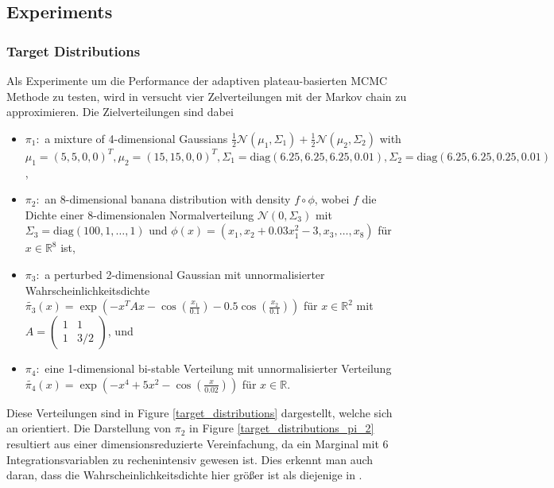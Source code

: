 \documentclass{scrartcl}
\begin{document}
    \subsection{Experiments}
    \subsubsection{Target Distributions}
    Als Experimente um die Performance der adaptiven plateau-basierten MCMC Methode zu testen, wird in \cite{lau2019} versucht vier Zelverteilungen
    mit der Markov chain zu approximieren. Die Zielverteilungen sind dabei
    \begin{itemize}
        \item $\pi_1:$ a mixture of 4-dimensional Gaussians $\frac12\mathcal{N}(\mu_1,\Sigma_1)+\frac12\mathcal{N}(\mu_2,\Sigma_2)$ with $\mu_1=(5,5,0,0)^T,\mu_2=(15,15,0,0)^T,\Sigma_1=\text{diag}(6.25,6.25,6.25,0.01),\Sigma_2=\text{diag}(6.25,6.25,0.25,0.01)$,
        \item $\pi_2:$ an 8-dimensional banana distribution with density $f\circ\phi$, wobei $f$ die Dichte einer 8-dimensionalen Normalverteilung $\mathcal{N}(0,\Sigma_3)$ mit $\Sigma_3=\text{diag}(100,1,\dots,1)$ und $\phi(x)=(x_1,x_2+0.03x_1^2-3,x_3,\dots,x_8)$ für $x\in\mathbb{R}^8$ ist,
        \item $\pi_3:$ a perturbed 2-dimensional Gaussian mit unnormalisierter Wahrscheinlichkeitsdichte $\tilde{\pi_3}(x)=\exp\left( -x^TAx-\cos\left( \frac{x_1}{0.1} \right) -0.5\cos\left( \frac{x_2}{0.1} \right) \right)$ für $x\in\mathbb{R}^2$ mit
        $A=\begin{pmatrix}
                    1 & 1\\
                    1 & 3/2
        \end{pmatrix}$, und
        \item $\pi_4:$ eine 1-dimensional bi-stable Verteilung mit unnormalisierter Verteilung $\tilde{\pi_4}(x)=\exp\left( -x^4+5x^2-\cos\left( \frac{x}{0.02} \right) \right)$ für $x\in\mathbb{R}$.
    \end{itemize}
    Diese Verteilungen sind in Figure \ref{target_distributions} dargestellt, welche sich an \cite[Figure 3]{lau2019} orientiert. Die Darstellung
    von $\pi_2$ in Figure \ref{target_distributions_pi_2} resultiert aus einer dimensionsreduzierte Vereinfachung, da ein Marginal mit 6 Integrationsvariablen zu
    rechenintensiv gewesen ist. Dies erkennt man auch daran, dass die Wahrscheinlichkeitsdichte hier größer ist als diejenige in \cite{lau2019}.
\end{document}
